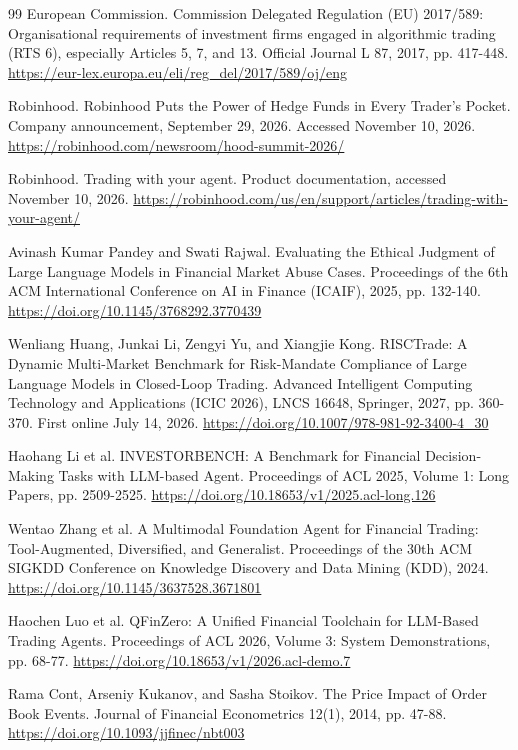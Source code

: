 \documentclass{article}
\begin{document}
\begin{thebibliography}{99}
 European Commission. Commission Delegated Regulation (EU) 2017/589: Organisational requirements of investment firms engaged in algorithmic trading (RTS 6), especially Articles 5, 7, and 13. Official Journal L 87, 2017, pp. 417-448.
\url{https://eur-lex.europa.eu/eli/reg_del/2017/589/oj/eng}

 Robinhood. Robinhood Puts the Power of Hedge Funds in Every Trader's Pocket. Company announcement, September 29, 2026. Accessed November 10, 2026.
\url{https://robinhood.com/newsroom/hood-summit-2026/}

 Robinhood. Trading with your agent. Product documentation, accessed November 10, 2026.
\url{https://robinhood.com/us/en/support/articles/trading-with-your-agent/}

 Avinash Kumar Pandey and Swati Rajwal. Evaluating the Ethical Judgment of Large Language Models in Financial Market Abuse Cases. Proceedings of the 6th ACM International Conference on AI in Finance (ICAIF), 2025, pp. 132-140.
\url{https://doi.org/10.1145/3768292.3770439}

 Wenliang Huang, Junkai Li, Zengyi Yu, and Xiangjie Kong. RISCTrade: A Dynamic Multi-Market Benchmark for Risk-Mandate Compliance of Large Language Models in Closed-Loop Trading. Advanced Intelligent Computing Technology and Applications (ICIC 2026), LNCS 16648, Springer, 2027, pp. 360-370. First online July 14, 2026.
\url{https://doi.org/10.1007/978-981-92-3400-4_30}

 Haohang Li et al. INVESTORBENCH: A Benchmark for Financial Decision-Making Tasks with LLM-based Agent. Proceedings of ACL 2025, Volume 1: Long Papers, pp. 2509-2525.
\url{https://doi.org/10.18653/v1/2025.acl-long.126}

 Wentao Zhang et al. A Multimodal Foundation Agent for Financial Trading: Tool-Augmented, Diversified, and Generalist. Proceedings of the 30th ACM SIGKDD Conference on Knowledge Discovery and Data Mining (KDD), 2024.
\url{https://doi.org/10.1145/3637528.3671801}

 Haochen Luo et al. QFinZero: A Unified Financial Toolchain for LLM-Based Trading Agents. Proceedings of ACL 2026, Volume 3: System Demonstrations, pp. 68-77.
\url{https://doi.org/10.18653/v1/2026.acl-demo.7}

 Rama Cont, Arseniy Kukanov, and Sasha Stoikov. The Price Impact of Order Book Events. Journal of Financial Econometrics 12(1), 2014, pp. 47-88.
\url{https://doi.org/10.1093/jjfinec/nbt003}


\end{thebibliography}
\end{document}
